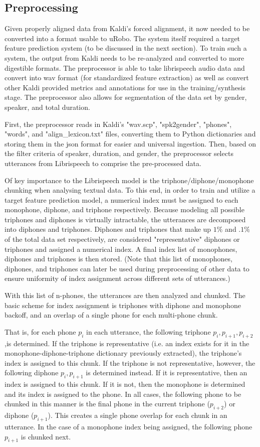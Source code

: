 \documentclass[10pt, journal, compsoc]{IEEEtran}
\begin{document}
\subsection{Preprocessing}
Given properly aligned data from Kaldi's forced alignment, it now needed to be converted into a format usable to uRobo. The system itself required a target feature prediction system (to be discussed in the next section). To train such a system, the output from Kaldi needs to be re-analyzed and converted to more digestible formats. The preprocessor is able to take librispeech audio data and convert into wav format (for standardized feature extraction) as well as convert other Kaldi provided metrics and annotations for use in the training/synthesis stage. The preprocessor also allows for segmentation of the data set by gender, speaker, and total duration.\par
First, the preprocessor reads in Kaldi's "wav.scp", "spk2gender", "phones", "words", and "align\_lexicon.txt" files, converting them to Python dictionaries and storing them in the json format for easier and universal ingestion. Then, based on the filter criteria of speaker, duration, and gender, the preprocessor selects utterances from Librispeech to comprise the pre-processed data.\par
Of key importance to the Librispeech model is the triphone/diphone/monophone chunking when analysing textual data. To this end, in order to train and utilize a target feature prediction model, a numerical index must be assigned to each monophone, diphone, and triphone respectively. Because modeling all possible triphones and diphones is virtually intractable, the utterances are decomposed into diphones and triphones. Diphones and triphones that make up $1\%$ and $.1\%$ of the total data set respectively, are considered "representative" diphones or triphones and assigned a numerical index. A final index list of monophones, diphones and triphones is then stored. (Note that this list of monophones, diphones, and triphones can later be used during preprocessing of other data to ensure uniformity of index assignment across different sets of utterances.)\par
With this list of n-phones, the utterances are then analyzed and chunked. The basic scheme for index assignment is triphones with diphone and monophone backoff, and an overlap of a single phone for each multi-phone chunk.\par
That is, for each phone $p_i$ in each utterance, the following triphone $p_i,p_{i+1},p_{i+2}$,is determined. If the triphone is representative (i.e. an index exists for it in the monophone-diphone-triphone dictionary previously extracted), the triphone's index is assigned to this chunk. If the triphone is not representative, however, the following diphone $p_i,p_{i+1}$ is determined instead. If it is representative, then an index is assigned to this chunk. If it is not, then the monophone is determined and its index is assigned to the phone. In all cases, the following phone to be chunked in this manner is the final phone in the current triphone ($p_{i+2}$) or diphone ($p_{i+1}$). This creates a single phone overlap for each chunk in an utterance. In the case of a monophone index being assigned, the following phone $p_{i+1}$ is chunked next.\par
\end{document}
